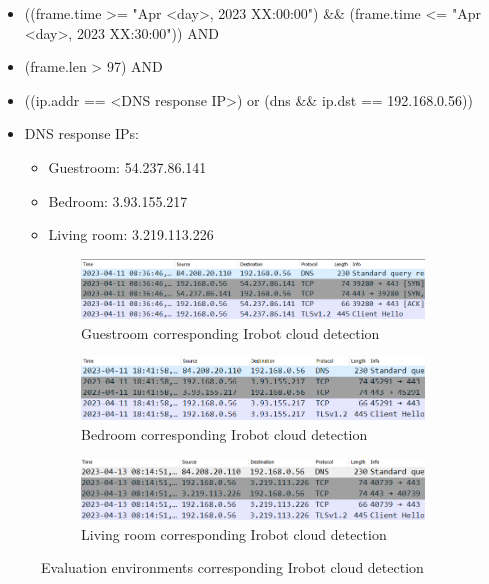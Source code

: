 \begin{itemize}
        \item ((frame.time >= "Apr <day>, 2023 XX:00:00") \&\& (frame.time <= "Apr <day>, 2023 XX:30:00")) AND
        \item (frame.len > 97) AND 
        \item  ((ip.addr == <DNS response IP>) or (dns \&\& ip.dst == 192.168.0.56))
       \item DNS response IPs:  \begin{itemize}
                                \item Guestroom: 54.237.86.141 
                                \item Bedroom: 3.93.155.217 
                                \item Living room: 3.219.113.226 
                            \end{itemize}
\end{itemize}

\begin{figure}[H]
    \centering
    
    \begin{subfigure}{0.80\textwidth}
        \centering
        \includegraphics[width=\linewidth]{figures/Evaluation_cloud_detection1.png}
        \caption{Guestroom corresponding Irobot cloud detection}
        \label{fig:Evaluation_coulddetection_1}
    \end{subfigure}
    \hfill
    \begin{subfigure}{0.80\textwidth}
        \centering
        \includegraphics[width=\linewidth]{figures/Evaluation_cloud_detection2.png}
        \caption{Bedroom corresponding Irobot cloud detection}
        \label{fig:Evaluation_clouddetection_2}
    \end{subfigure}
    \hfill
    \begin{subfigure}{0.80\textwidth}
        \centering
        \includegraphics[width=\linewidth]{figures/Evaluation_cloud_detection3.png}
        \caption{Living room corresponding Irobot cloud detection}
        \label{fig:Evaluation_clouddetection_3}
    \end{subfigure}
    
    \caption{Evaluation environments corresponding Irobot cloud detection}
    \label{fig:evaluation_corresponding_cloud}
\end{figure}

